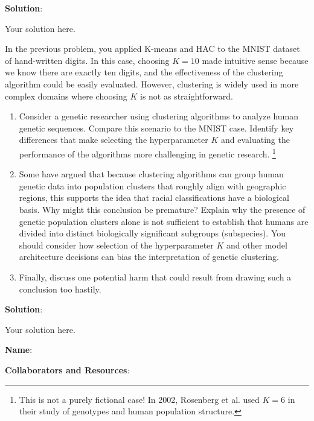 \documentclass[submit]{../harvardml}
\newenvironment{solution}{
    \vspace{2mm}
    \color{blue}\noindent\textbf{Solution}:
}{}
\begin{document}
\begin{solution}
	Your solution here.
\end{solution}


\newpage

\begin{problem}

In the previous problem, you applied K-means and HAC to the MNIST dataset of hand-written digits. In this case, choosing $K=10$ made intuitive sense because we know there are exactly ten digits, and the effectiveness of the clustering algorithm could be easily evaluated. However, clustering is widely used in more complex domains where choosing $K$ is not as straightforward.
\begin{enumerate}
  \item Consider a genetic researcher using clustering algorithms to analyze human genetic sequences. Compare this scenario to the MNIST case. Identify key differences that make selecting the hyperparameter $K$ and evaluating the performance of the algorithms more challenging in genetic research.
  \footnote{This is not a purely fictional case! In 2002, Rosenberg et al. used $K = 6$ in their study of genotypes and human population structure.}
  
  \item Some have argued that because clustering algorithms can group human genetic data into population clusters that roughly align with geographic regions, this supports the idea that racial classifications have a biological basis. Why might this conclusion be premature? Explain why the presence of genetic population clusters alone is not sufficient to establish that humans are divided into distinct biologically significant subgroups (subspecies). You should consider how selection of the hyperparameter $K$ and other model architecture decisions can bias the interpretation of genetic clustering.
  
  \item Finally, discuss one potential harm that could result from drawing such a conclusion too hastily.
\end{enumerate}
\end{problem}

\begin{solution}
	Your solution here.
\end{solution}

\newpage

\textbf{Name}:

\textbf{Collaborators and Resources}: 
\end{document}
